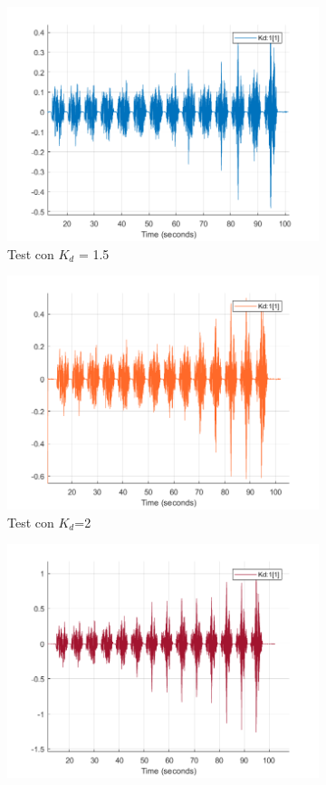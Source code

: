 \begin{figure}[!ht]
\begin{subfigure}{.5\textwidth}
  \centering
  \includegraphics[width=.8\linewidth]{Immagini/Sperimentale/Test_Kd=1.5.png}  
  \caption{Test con $K_d$ = 1.5}
  \label{fig:sub-kd1.5}
\end{subfigure}
\begin{subfigure}{.5\textwidth}
  \centering
  \includegraphics[width=.8\linewidth]{Immagini/Sperimentale/Test_Kd=2.png}  
  \caption{Test con $K_d$=2}
  \label{fig:sub-kd2}
\end{subfigure}
\begin{subfigure}{.5\textwidth}
  \centering
  \includegraphics[width=.8\linewidth]{Immagini/Sperimentale/Test_Kd=3.png}  

\end{subfigure}
\end{figure}

